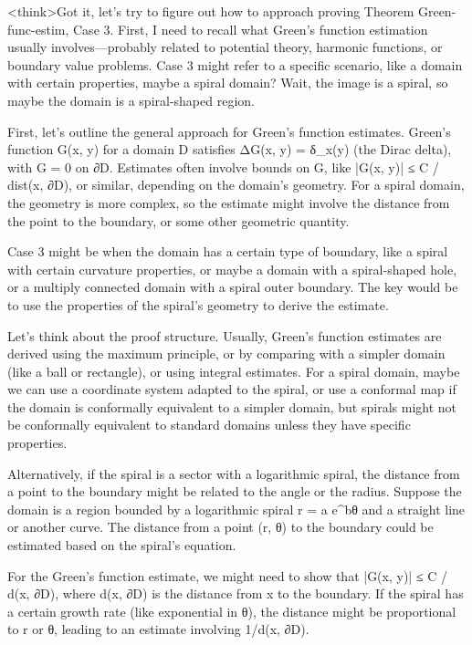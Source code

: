 <think>Got it, let's try to figure out how to approach proving Theorem Green-func-estim, Case 3. First, I need to recall what Green's function estimation usually involves—probably related to potential theory, harmonic functions, or boundary value problems. Case 3 might refer to a specific scenario, like a domain with certain properties, maybe a spiral domain? Wait, the image is a spiral, so maybe the domain is a spiral-shaped region. 

First, let's outline the general approach for Green's function estimates. Green's function G(x, y) for a domain D satisfies ΔG(x, y) = δ_x(y) (the Dirac delta), with G = 0 on ∂D. Estimates often involve bounds on G, like |G(x, y)| ≤ C / dist(x, ∂D), or similar, depending on the domain's geometry. For a spiral domain, the geometry is more complex, so the estimate might involve the distance from the point to the boundary, or some other geometric quantity.

Case 3 might be when the domain has a certain type of boundary, like a spiral with certain curvature properties, or maybe a domain with a spiral-shaped hole, or a multiply connected domain with a spiral outer boundary. The key would be to use the properties of the spiral's geometry to derive the estimate. 

Let's think about the proof structure. Usually, Green's function estimates are derived using the maximum principle, or by comparing with a simpler domain (like a ball or rectangle), or using integral estimates. For a spiral domain, maybe we can use a coordinate system adapted to the spiral, or use a conformal map if the domain is conformally equivalent to a simpler domain, but spirals might not be conformally equivalent to standard domains unless they have specific properties.

Alternatively, if the spiral is a sector with a logarithmic spiral, the distance from a point to the boundary might be related to the angle or the radius. Suppose the domain is a region bounded by a logarithmic spiral r = a e^{bθ} and a straight line or another curve. The distance from a point (r, θ) to the boundary could be estimated based on the spiral's equation. 

For the Green's function estimate, we might need to show that |G(x, y)| ≤ C / d(x, ∂D), where d(x, ∂D) is the distance from x to the boundary. If the spiral has a certain growth rate (like exponential in θ), the distance might be proportional to r or θ, leading to an estimate involving 1/d(x, ∂D). 

